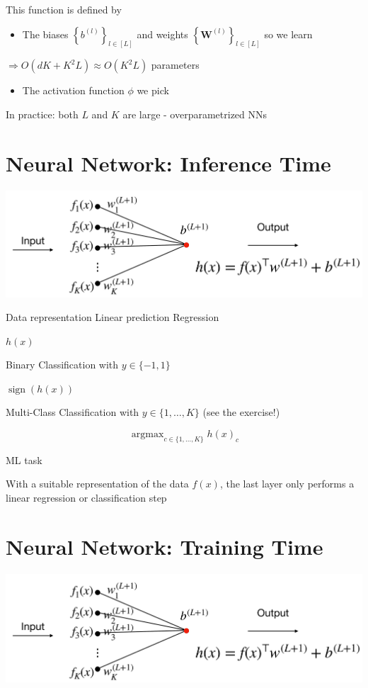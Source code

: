 \documentclass[10pt]{article}
\begin{document}
This function is defined by

\begin{itemize}
  \item The biases $\left\{b^{(l)}\right\}_{l \in[L]}$ and weights $\left\{\mathbf{W}^{(l)}\right\}_{l \in[L]}$ so we learn
\end{itemize}

$\Rightarrow O\left(d K+K^{2} L\right) \approx O\left(K^{2} L\right)$ parameters

\begin{itemize}
  \item The activation function $\phi$ we pick
\end{itemize}

In practice: both $L$ and $K$ are large - overparametrized NNs

\section*{Neural Network: Inference Time}
\begin{center}
\includegraphics[max width=\textwidth]{2024_01_08_0e0dcffe4bc8c6049046g-11}
\end{center}

Data representation
Linear prediction
Regression

$h(x)$

Binary Classification with $y \in\{-1,1\}$

$\operatorname{sign}(h(x))$

Multi-Class Classification with $y \in\{1, \ldots, K\}$ (see the exercise!)

$$
\operatorname{argmax}_{c \in\{1, \ldots, K\}} h(x)_{c}
$$

ML task

With a suitable representation of the data $f(x)$, the last layer only performs a linear regression or classification step

\section*{Neural Network: Training Time}
\begin{center}
\includegraphics[max width=\textwidth]{2024_01_08_0e0dcffe4bc8c6049046g-12}
\end{center}
\end{document}
